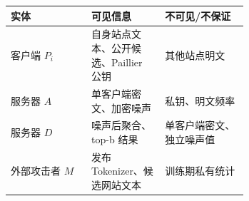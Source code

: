 \begin{tabular}{lp{0.31\linewidth}p{0.35\linewidth}}
\toprule
实体 & 可见信息 & 不可见/不保证 \\
\midrule
客户端 $P_i$ & 自身站点文本、公开候选、Paillier 公钥 & 其他站点明文 \\
服务器 $A$ & 单客户端密文、加密噪声 & 私钥、明文频率 \\
服务器 $D$ & 噪声后聚合、top-b 结果 & 单客户端密文、独立噪声值 \\
外部攻击者 $M$ & 发布 Tokenizer、候选网站文本 & 训练期私有统计 \\
\bottomrule
\end{tabular}

